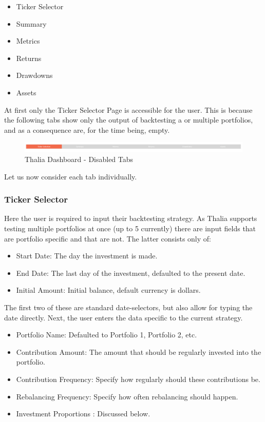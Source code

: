 \documentclass[main.tex]{subfiles}
\begin{document}
\begin{itemize}
    \item Ticker Selector
    \item Summary
    \item Metrics
    \item Returns 
    \item Drawdowns
    \item Assets
\end{itemize}

At first only the Ticker Selector Page is accessible for the user. 
This is because the following tabs show only the output of backtesting a or multiple portfolios, and as a consequence are, for the time being, empty.

\begin{figure}[H]
   \centering
   \includegraphics[width=\textwidth]{08Appendices/081User/081Pictures/disabled_tabs.png}
   \caption{Thalia Dashboard - Disabled Tabs}
   \label{thalia_disabled_tabs}
\end{figure}

Let us now consider each tab individually. 

\subsubsection*{Ticker Selector}

Here the user is required to input their backtesting strategy. As Thalia supports testing multiple portfolios at once (up to 5 currently) there are input fields that are 
portfolio specific and that are not. The latter consists only of:

\begin{itemize}
    \item Start Date: The day the investment is made.
    \item End Date: The last day of the investment, defaulted to the present date.
    \item Initial Amount: Initial balance, default currency is dollars.
\end{itemize}

The first two of these are standard date-selectors, but also allow for typing the date directly. Next, the user enters the data specific to the current strategy.

\begin{itemize}
    \item Portfolio Name: Defaulted to Portfolio 1, Portfolio 2, etc. 
    \item Contribution Amount: The amount that should be regularly invested into the portfolio.
    \item Contribution Frequency: Specify how regularly should these contributions be.
    \item Rebalancing Frequency: Specify how often rebalancing should happen. 
    \item Investment Proportions : Discussed below.
\end{itemize}
\end{document}
